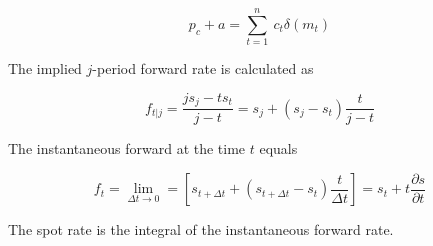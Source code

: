 \begin{equation}
  \label{bondprceq2}
  p_c+a=\sum_{t=1}^n \ c_t \delta(m_t) \end{equation}


The implied $j$-period forward rate is calculated as

\begin{equation}
  \label{forwrate}
  f_{t|j}=\frac{js_j-ts_t}{j-t}=s_j+(s_j-s_t)\frac{t}{j-t}
\end{equation}

The instantaneous forward at the time $t$ equals

\begin{equation}
  \label{instfwdrate}
  f_t=\lim_{\Delta t \rightarrow 0}=\left[s_{t+\Delta t}+(s_{t+\Delta t}-s_t)\frac{t}{\Delta t}\right]=s_t+t\frac{\partial s}{\partial t}
\end{equation}

The spot rate is the integral of the instantaneous forward rate.


